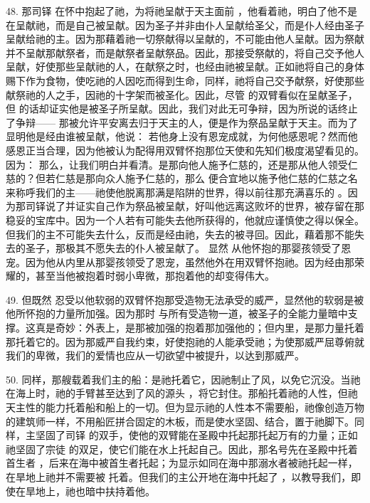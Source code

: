 48. 那司铎  在怀中抱起了祂，为将祂呈献于天主面前 ，他看着祂，明白了他不是在呈献祂，而是自己被呈献。因为圣子并非由仆人呈献给圣父，而是仆人经由圣子呈献给祂的主。因为那藉着祂一切祭献得以呈献的，不可能由他人呈献。因为祭献并不呈献那献祭者，而是献祭者呈献祭品。因此，那接受祭献的，将自己交予他人呈献，好使那些呈献祂的人，在献祭之时，也经由祂被呈献。正如祂将自己的身体赐下作为食物，使吃祂的人因吃而得到生命，同样，祂将自己交予献祭，好使那些献祭祂的人之手，因祂的十字架而被圣化。因此，尽管  的双臂看似在呈献圣子，但  的话却证实他是被圣子所呈献。因此，我们对此无可争辩，因为所说的话终止了争辩—— 那被允许平安离去归于天主的人，便是作为祭品呈献于天主。而为了显明他是经由谁被呈献，他说： 若他身上没有恩宠成就，为何他感恩呢？然而他感恩正当合理，因为他被认为配得用双臂怀抱那位天使和先知们极度渴望看见的。因为： 那么，让我们明白并看清。是那向他人施予仁慈的，还是那从他人领受仁慈的？但若仁慈是那向众人施予仁慈的，那么  便合宜地以施予他仁慈的仁慈之名来称呼我们的主——祂使他脱离那满是陷阱的世界，得以前往那充满喜乐的 。因为那司铎说了并证实自己作为祭品被呈献，好叫他远离这败坏的世界，被存留在那稳妥的宝库中。因为一个人若有可能失去他所获得的，他就应谨慎使之得以保全。但我们的主不可能失去什么，反而是经由祂，失去的被寻回。因此，藉着那不能失去的圣子，那极其不愿失去的仆人被呈献了。 显然  从他怀抱的那婴孩领受了恩宠。因为他从内里从那婴孩领受了恩宠，虽然他外在用双臂怀抱祂。因为经由那荣耀的，甚至当他被抱着时弱小卑微，那抱着他的却变得伟大。\par

49. 但既然  忍受以他软弱的双臂怀抱那受造物无法承受的威严，显然他的软弱是被他所怀抱的力量所加强。因为那时  与所有受造物一道，被圣子的全能力量暗中支撑。这真是奇妙：外表上，是那被加强的抱着那加强他的；但内里，是那力量托着那托着它的。因为那威严自我约束，好使抱祂的人能承受祂；为使那威严屈尊俯就我们的卑微，我们的爱情也应从一切欲望中被提升，以达到那威严。\par

50. 同样，那艘载着我们主的船：是祂托着它，因祂制止了风，以免它沉没。当祂在海上时，祂的手臂甚至达到了风的源头 ，将它封住。那船托着祂的人性，但祂天主性的能力托着船和船上的一切。但为显示祂的人性本不需要船，祂像创造万物的建筑师一样，不用船匠拼合固定的木板，而是使水坚固、结合，置于祂脚下。同样，主坚固了司铎  的双手，使他的双臂能在圣殿中托起那托起万有的力量；正如祂坚固了宗徒  的双足，使它们能在水上托起自己。因此，那名号先在圣殿中托着首生者 ，后来在海中被首生者托起；为显示如同在海中那溺水者被祂托起一样，在旱地上祂并不需要被  托着。但我们的主公开地在海中托起了 ，以教导我们，即使在旱地上，祂也暗中扶持着他。\par

